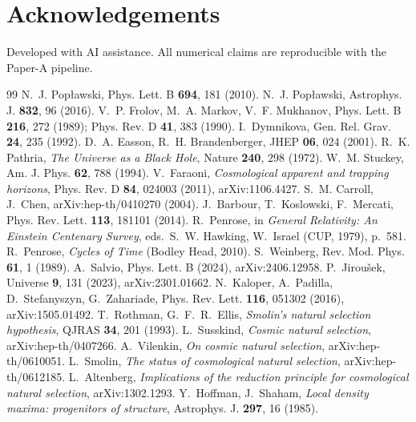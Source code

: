 \documentclass[11pt]{article}
\begin{document}
\section*{Acknowledgements}
Developed with AI assistance. All numerical claims are reproducible with the Paper-A pipeline.

\begin{thebibliography}{99}
 N.~J. Pop{\l}awski, Phys. Lett. B \textbf{694}, 181 (2010).
 N.~J. Pop{\l}awski, Astrophys. J. \textbf{832}, 96 (2016).
 V.~P. Frolov, M.~A. Markov, V.~F. Mukhanov, Phys. Lett. B \textbf{216}, 272 (1989); Phys. Rev. D \textbf{41}, 383 (1990).
 I.~Dymnikova, Gen. Rel. Grav. \textbf{24}, 235 (1992).
 D.~A. Easson, R.~H. Brandenberger, JHEP \textbf{06}, 024 (2001).
 R.~K. Pathria, \emph{The Universe as a Black Hole}, Nature \textbf{240}, 298 (1972).
 W.~M. Stuckey, Am. J. Phys. \textbf{62}, 788 (1994).
 V.~Faraoni, \emph{Cosmological apparent and trapping horizons}, Phys. Rev. D \textbf{84}, 024003 (2011), arXiv:1106.4427.
 S.~M. Carroll, J.~Chen, arXiv:hep-th/0410270 (2004).
 J.~Barbour, T.~Koslowski, F.~Mercati, Phys. Rev. Lett. \textbf{113}, 181101 (2014).
 R.~Penrose, in \emph{General Relativity: An Einstein Centenary Survey}, eds.\ S.~W. Hawking, W.~Israel (CUP, 1979), p.~581.
 R.~Penrose, \emph{Cycles of Time} (Bodley Head, 2010).
 S.~Weinberg, Rev. Mod. Phys. \textbf{61}, 1 (1989).
 A.~Salvio, Phys. Lett. B (2024), arXiv:2406.12958.
 P.~Jirou\v{s}ek, Universe \textbf{9}, 131 (2023), arXiv:2301.01662.
 N.~Kaloper, A.~Padilla, D.~Stefanyszyn, G.~Zahariade, Phys. Rev. Lett. \textbf{116}, 051302 (2016), arXiv:1505.01492.
 T.~Rothman, G.~F.~R.~Ellis, \emph{Smolin's natural selection hypothesis}, QJRAS \textbf{34}, 201 (1993).
 L.~Susskind, \emph{Cosmic natural selection}, arXiv:hep-th/0407266.
 A.~Vilenkin, \emph{On cosmic natural selection}, arXiv:hep-th/0610051.
 L.~Smolin, \emph{The status of cosmological natural selection}, arXiv:hep-th/0612185.
 L.~Altenberg, \emph{Implications of the reduction principle for cosmological natural selection}, arXiv:1302.1293.
 Y.~Hoffman, J.~Shaham, \emph{Local density maxima: progenitors of structure}, Astrophys. J. \textbf{297}, 16 (1985).

\end{thebibliography}
\end{document}
